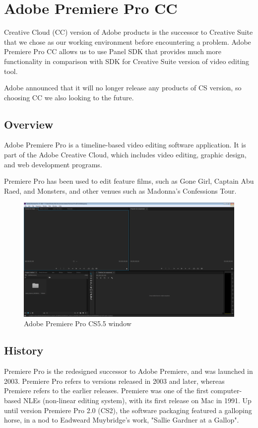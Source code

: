 \documentclass[thesis=B,english]{FITthesis}[2012/10/20]
\begin{document}
\section{Adobe Premiere Pro CC}
Creative Cloud (CC) version of Adobe products is the successor to Creative Suite that we chose as our working environment before encountering a problem. Adobe Premiere Pro CC allows us to use Panel SDK that provides much more functionality in comparison with SDK for Creative Suite version of video editing tool. 

Adobe announced that it will no longer release any products of CS version\cite{CC}, so choosing CC we also looking to the future. 

\subsection{Overview}
Adobe Premiere Pro is a timeline-based video editing software application. It is part of the Adobe Creative Cloud, which includes video editing, graphic design, and web development programs.

Premiere Pro has been used to edit feature films, such as Gone Girl, Captain Abu Raed, and Monsters, and other venues such as Madonna's Confessions Tour.\cite{adobe}
	\begin{figure}
		\centering
		\includegraphics[width=1.1\textwidth]{PremiereMain.png}
		\caption{Adobe Premiere Pro CS5.5 window}\label{fig:APPWindow}
	\end{figure}
\subsection{History}
Premiere Pro is the redesigned successor to Adobe Premiere, and was launched in 2003. Premiere Pro refers to versions released in 2003 and later, whereas Premiere refers to the earlier releases. Premiere was one of the first computer-based NLEs (non-linear editing system), with its first release on Mac in 1991. Up until version Premiere Pro 2.0 (CS2), the software packaging featured a galloping horse, in a nod to Eadweard Muybridge's work, "Sallie Gardner at a Gallop".\cite{adobe}
	
\end{document}
